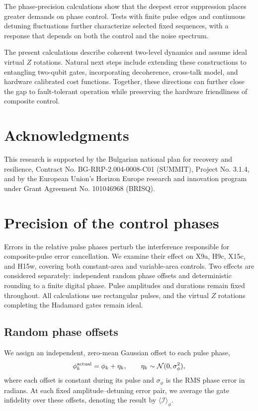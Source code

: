 \documentclass[10pt,aps,twocolumn,pra,floatfix,superscriptaddress]{revtex4-2}
\begin{document}
The phase-precision calculations show that the deepest error suppression places greater demands on phase control. Tests with finite pulse edges and continuous detuning fluctuations further characterize selected fixed sequences, with a response that depends on both the control and the noise spectrum.


The present calculations describe coherent two-level dynamics and assume ideal virtual $Z$ rotations. Natural next steps include extending these constructions to entangling two-qubit gates, incorporating decoherence, cross-talk model, and hardware calibrated cost functions. Together, these directions can further close the gap to fault-tolerant operation while preserving the hardware friendliness of composite control.

\section*{Acknowledgments}
This research is supported by the Bulgarian national plan for recovery and resilience, Contract No. BG-RRP-2.004-0008-C01 (SUMMIT), Project No. 3.1.4, and by the European Union's Horizon Europe research and innovation program under Grant Agreement No. 101046968 (BRISQ). 


\appendix
\section{Precision of the control phases}
\label{app:phase_precision}

Errors in the relative pulse phases perturb the interference
responsible for composite-pulse error cancellation. We examine
their effect on X9a, H9c, X15c, and H15w, covering both
constant-area and variable-area controls. Two effects are considered separately:
independent random phase offsets and deterministic rounding to a finite digital phase. Pulse amplitudes and durations remain fixed throughout. All calculations use rectangular
pulses, and the virtual $Z$ rotations completing the Hadamard gates remain ideal.

\subsection{Random phase offsets}

We assign an independent, zero-mean Gaussian offset to each
pulse phase,
\begin{equation}
\phi_k^{\rm actual}=\phi_k+\eta_k,
\qquad
\eta_k\sim\mathcal N(0,\sigma_\phi^2),
\end{equation}
where each offset is constant during its pulse and
$\sigma_\phi$ is the RMS phase error in radians. At each fixed amplitude--detuning error pair, we average the gate infidelity over these offsets, denoting the result by $\langle\mathcal I\rangle_\phi$.
\end{document}
